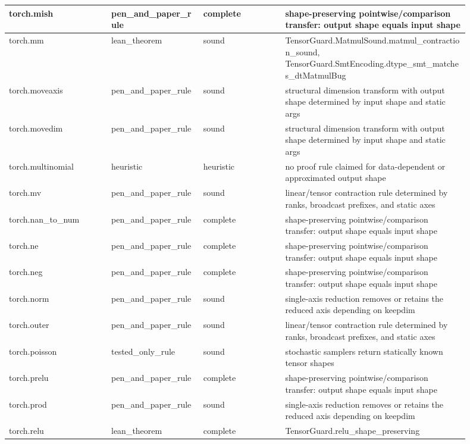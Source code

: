 \documentclass[10pt]{article}
\begin{document}
\begin{longtable}{|p{0.20\linewidth}|p{0.18\linewidth}|p{0.16\linewidth}|p{0.36\linewidth}|}
\hline
torch.mish & pen\_and\_paper\_rule & complete & shape-preserving pointwise/comparison transfer: output shape equals input shape \\
\hline
torch.mm & lean\_theorem & sound & TensorGuard.MatmulSound.matmul\_contraction\_sound, TensorGuard.SmtEncoding.dtype\_smt\_matches\_dtMatmulBug \\
\hline
torch.moveaxis & pen\_and\_paper\_rule & sound & structural dimension transform with output shape determined by input shape and static args \\
\hline
torch.movedim & pen\_and\_paper\_rule & sound & structural dimension transform with output shape determined by input shape and static args \\
\hline
torch.multinomial & heuristic & heuristic & no proof rule claimed for data-dependent or approximated output shape \\
\hline
torch.mv & pen\_and\_paper\_rule & sound & linear/tensor contraction rule determined by ranks, broadcast prefixes, and static axes \\
\hline
torch.nan\_to\_num & pen\_and\_paper\_rule & complete & shape-preserving pointwise/comparison transfer: output shape equals input shape \\
\hline
torch.ne & pen\_and\_paper\_rule & complete & shape-preserving pointwise/comparison transfer: output shape equals input shape \\
\hline
torch.neg & pen\_and\_paper\_rule & complete & shape-preserving pointwise/comparison transfer: output shape equals input shape \\
\hline
torch.norm & pen\_and\_paper\_rule & sound & single-axis reduction removes or retains the reduced axis depending on keepdim \\
\hline
torch.outer & pen\_and\_paper\_rule & sound & linear/tensor contraction rule determined by ranks, broadcast prefixes, and static axes \\
\hline
torch.poisson & tested\_only\_rule & sound & stochastic samplers return statically known tensor shapes \\
\hline
torch.prelu & pen\_and\_paper\_rule & complete & shape-preserving pointwise/comparison transfer: output shape equals input shape \\
\hline
torch.prod & pen\_and\_paper\_rule & sound & single-axis reduction removes or retains the reduced axis depending on keepdim \\
\hline
torch.relu & lean\_theorem & complete & TensorGuard.relu\_shape\_preserving \\

\end{longtable}
\end{document}
